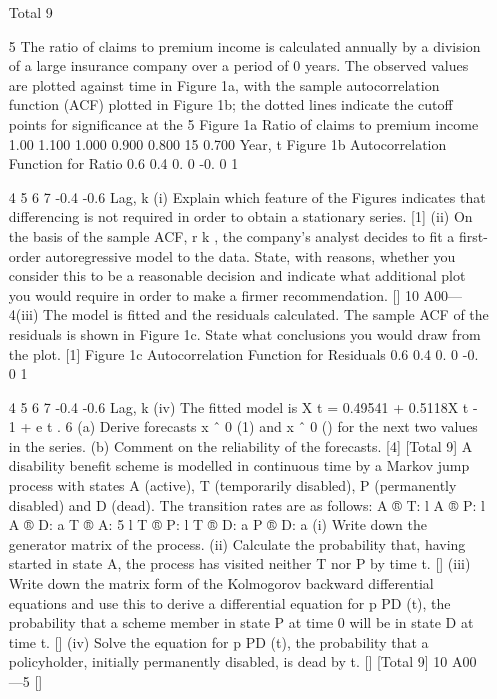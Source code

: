 \documentclass[a4paper,1pt]{article}
\begin{document}
\begin{enumerate}
\item
[Total 9]

5
The ratio of claims to premium income is calculated annually by a division of a large
insurance company over a period of 0 years. The observed values are plotted against
time in Figure 1a, with the sample autocorrelation function (ACF) plotted in
Figure 1b; the dotted lines indicate the cutoff points for significance at the 5%
Figure 1a
Ratio of claims to premium income
1.00
1.100
1.000
0.900
0.800
15
0.700
Year, t
Figure 1b
Autocorrelation Function for Ratio
0.6
0.4
0.
0
-0.
0
1


4
5
6
7
-0.4
-0.6
Lag, k
(i) Explain which feature of the Figures indicates that differencing is not required
in order to obtain a stationary series.
[1]
(ii) On the basis of the sample ACF, r k , the company’s analyst decides to fit a
first-order autoregressive model to the data. State, with reasons, whether you
consider this to be a reasonable decision and indicate what additional plot you
would require in order to make a firmer recommendation.
[]
10 A00—4(iii)
The model is fitted and the residuals calculated. The sample ACF of the
residuals is shown in Figure 1c. State what conclusions you would draw from
the plot.
[1]
Figure 1c
Autocorrelation Function for Residuals
0.6
0.4
0.
0
-0.
0
1


4
5
6
7
-0.4
-0.6
Lag, k
(iv)
The fitted model is
X t = 0.49541 + 0.5118X t - 1 + e t .
6
(a) Derive forecasts x ˆ 0 (1) and x ˆ 0 () for the next two values in the
series.
(b) Comment on the reliability of the forecasts.
[4]
[Total 9]
A disability benefit scheme is modelled in continuous time by a Markov jump process
with states A (active), T (temporarily disabled), P (permanently disabled) and
D (dead). The transition rates are as follows:
A ® T:  l
A ® P: l
A ® D: a
T ® A: 5 l
T ® P:  l
T ® D: a
P ® D:  a
(i) Write down the generator matrix of the process.
(ii) Calculate the probability that, having started in state A, the process has visited
neither T nor P by time t.
[]
(iii) Write down the matrix form of the Kolmogorov backward differential
equations and use this to derive a differential equation for p PD (t), the
probability that a scheme member in state P at time 0 will be in state D at
time t.
[]
(iv) Solve the equation for p PD (t), the probability that a policyholder, initially
permanently disabled, is dead by t.
[]
[Total 9]
10 A00—5
[]



\end{enumerate}
\end{document}
